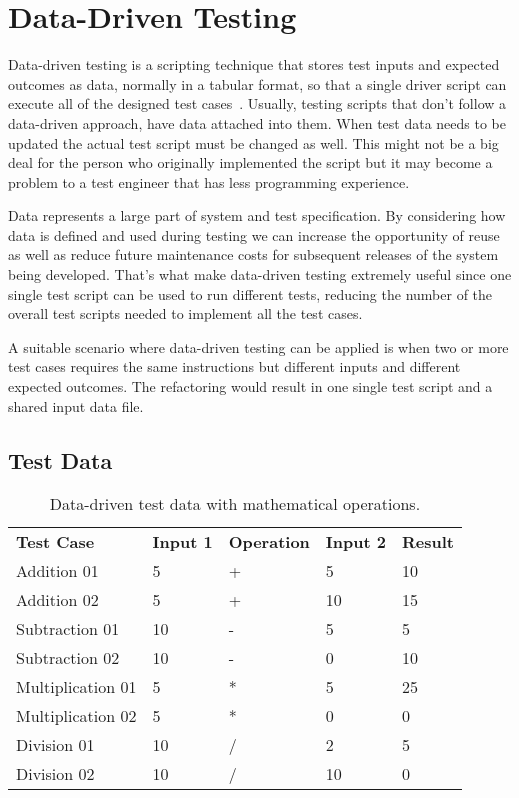 \section{Data-Driven Testing}

Data-driven testing is a scripting technique that stores test inputs and
expected outcomes as data, normally in a tabular format, so that a single
driver script can execute all of the designed test cases~\cite{Fewster99}.
Usually, testing scripts that don't follow a data-driven approach, have data
attached into them. When test data needs to be updated the actual test script
must be changed as well. This might not be a big deal for the person who
originally implemented the script but it may become a problem to a test engineer
that has less programming experience.

Data represents a large part of system and test specification. By considering
how data is defined and used during testing we can increase the opportunity
of reuse as well as reduce future maintenance costs for subsequent releases of
the system being developed. That's what make data-driven testing extremely
useful since one single test script can be used to run different tests, reducing
the number of the overall test scripts needed to implement all the test cases.

A suitable scenario where data-driven testing can be applied is when two or more
test cases requires the same instructions but different inputs and different
expected outcomes. The refactoring would result in one single test script and a
shared input data file.

\subsection{Test Data}

\begin{table}[!ht]
\centering
\begin{tabular}{lllll}
\textbf{Test Case} & \textbf{Input 1} & \textbf{Operation} & \textbf{Input 2} & \textbf{Result} \\
Addition 01 & 5 & + & 5 & 10 \\
Addition 02 & 5 & + & 10 & 15 \\
Subtraction 01 & 10 & - & 5 & 5 \\
Subtraction 02 & 10 & - & 0 & 10 \\
Multiplication 01 & 5 & * & 5 & 25 \\
Multiplication 02 & 5 & * & 0 & 0 \\
Division 01 & 10 & / & 2 & 5 \\
Division 02 & 10 & / & 10 & 0 \\
\end{tabular}
\caption{Data-driven test data with mathematical operations.}
\label{table:tab1}
\end{table}

